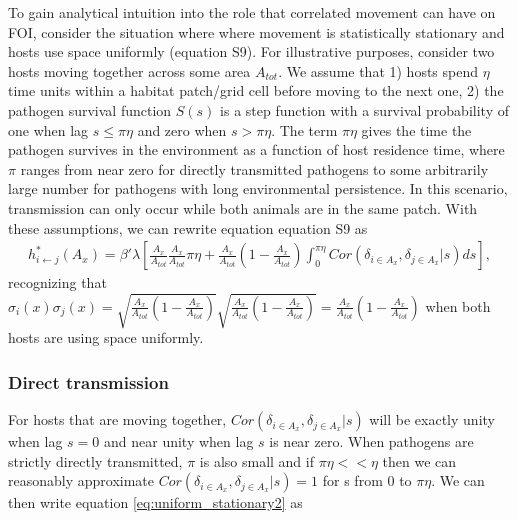 \documentclass[letterpaper]{article}
\begin{document}
To gain analytical intuition into the role that correlated movement can have on FOI, consider the situation where where movement is statistically stationary and hosts use space uniformly (equation S9).  %
For illustrative purposes, consider two hosts moving together across some area $A_{tot}$. We assume that 1) hosts spend $\eta$ time units within a habitat patch/grid cell before moving to the next one, 2) the pathogen survival function $S(s)$ is a step function with a survival probability of one when lag $s \leq \pi \eta$ and zero when $s > \pi \eta$.  
The term $\pi \eta$ gives the time the pathogen survives in the environment as a function of host residence time, where $\pi$ ranges from near zero for directly transmitted pathogens to some arbitrarily large number for pathogens with long environmental persistence.  
In this scenario, transmission can only occur while both animals are in the same patch. With these assumptions, we can rewrite equation equation S9 as 
\begin{equation}
    \begin{aligned}
        h^*_{i \leftarrow j}(A_x) = \beta' \lambda \left[\frac{A_x}{A_{tot}}\frac{A_x}{A_{tot}} \pi \eta + \frac{A_x}{A_{tot}}(1 - \frac{A_x}{A_{tot}}) \int_{0}^{\pi \eta} Cor(\delta_{i \in A_x}, \delta_{j \in A_x} | s) ds\right],
    \end{aligned}
    \label{eq:uniform_stationary2}
\end{equation}
recognizing that $\sigma_i(x) \sigma_j(x) = \sqrt{\frac{A_x}{A_{tot}}(1 - \frac{A_x}{A_{tot}})}\sqrt{\frac{A_x}{A_{tot}}(1 - \frac{A_x}{A_{tot}})} = \frac{A_x}{A_{tot}}(1 - \frac{A_x}{A_{tot}})$ when both hosts are using space uniformly.

\subsubsection*{Direct transmission}

For hosts that are moving together, $Cor(\delta_{i \in A_x}, \delta_{j \in A_x} | s)$ will be exactly unity when lag $s = 0$ and near unity when lag $s$ is near zero. When pathogens are strictly directly transmitted, $\pi$ is also small and if $\pi \eta << \eta$ then we can reasonably approximate $Cor(\delta_{i \in A_x}, \delta_{j \in A_x} | s) = 1$ for s from 0 to $\pi \eta$.  We can then write equation \ref{eq:uniform_stationary2} as 
\end{document}
